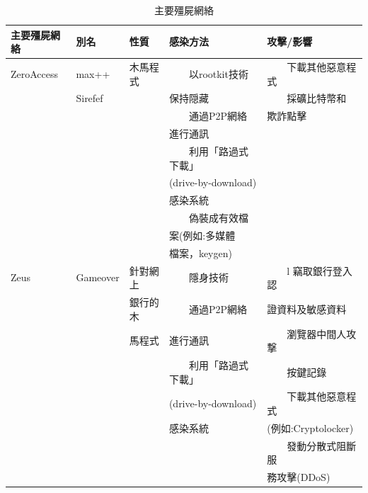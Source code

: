 \documentclass[14pt]{extarticle}
\newcommand{\tabitem}{~~\llap{\textbullet}~~}
\begin{document}
\begin{table}[!htbp]
\centering
\caption{主要殭屍網絡}
\begin{tabular}{lllll} \hline
\bf 主要殭屍網絡 & \bf 別名 & \bf 性質 & \bf 感染方法 & \bf 攻擊/影響\\\hline
ZeroAccess	& max++ & 木馬程式 & \tabitem 以rootkit技術  & \tabitem 下載其他惡意程式 \\
& 	Sirefef & &	保持隠藏 & \tabitem 採礦比特幣和 \\
&&& \tabitem 通過P2P網絡 & 欺詐點擊\\
&&& 進行通訊\\
&&& \tabitem 利用「路過式下載」\\
&&& (drive-by-download)\\
&&& 感染系統\\
&&& \tabitem 偽裝成有效檔\\
&&& 案(例如:多媒體\\
&&& 檔案，keygen)	\\\hline
Zeus	& Gameover & 針對網上 & \tabitem 隱身技術  & \tabitem l	竊取銀行登入認 \\
& 	 & 銀行的木 &	\tabitem 通過P2P網絡& 證資料及敏感資料 \\
&&馬程式& 進行通訊 & \tabitem 瀏覽器中間人攻撃 \\
&&& \tabitem 利用「路過式下載」 & \tabitem 按鍵記錄\\
&&& (drive-by-download) & \tabitem 下載其他惡意程式\\
&&& 感染系統 & (例如:Cryptolocker)\\
&&&& \tabitem 發動分散式阻斷服 \\
&&&& 務攻擊(DDoS) \\\hline

\end{tabular}
\end{table}
\newpage
\end{document}
